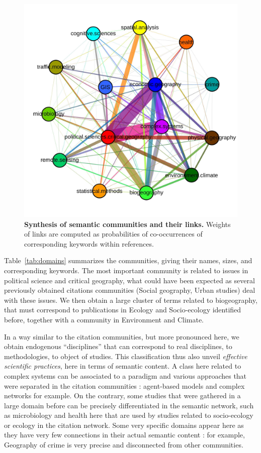 \begin{figure}
\centering
\includegraphics[width=\textwidth]{figures/Fig8.jpg}
\caption{\textbf{Synthesis of semantic communities and their links.} Weights of links are computed as probabilities of co-occurrences of corresponding keywords within references.}
\label{fig:comsynthesis}
\end{figure}

Table~\ref{tab:domains} summarizes the communities, giving their names, sizes, and corresponding keywords. The most important community is related to issues in political science and critical geography, what could have been expected as several previously obtained citations communities (Social geography, Urban studies) deal with these issues. We then obtain a large cluster of terms related to biogeography, that must correspond to publications in Ecology and Socio-ecology identified before, together with a community in Environment and Climate.


In a way similar to the citation communities, but more pronounced here, we obtain endogenous ``disciplines'' that can correspond to real disciplines, to methodologies, to object of studies. This classification thus also unveil \emph{effective scientific practices}, here in terms of semantic content. A class here related to complex systems can be associated to a paradigm and various approaches that were separated in the citation communities : agent-based models and complex networks for example. On the contrary, some studies that were gathered in a large domain before can be precisely differentiated in the semantic network, such as microbiology and health here that are used by studies related to socio-ecology or ecology in the citation network. Some very specific domains appear here as they have very few connections in their actual semantic content : for example, Geography of crime is very precise and disconnected from other communities.


